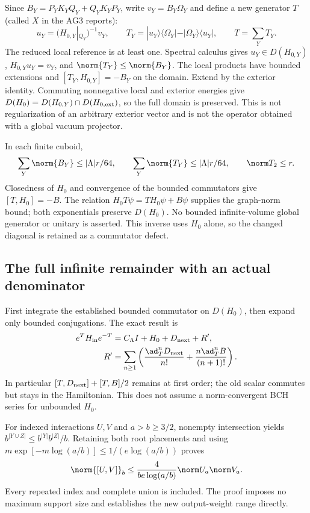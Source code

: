 Since $B_Y=P_YK_YQ_Y+Q_YK_YP_Y$, write $v_Y=B_Y\Omega_Y$ and define a new generator $T$ (called $X$ in the AG3 reports):
\begin{equation}
 u_Y=(H_{0,Y}|_{Q_Y})^{-1}v_Y,\qquad
 T_Y=|u_Y\rangle\langle\Omega_Y|-|\Omega_Y\rangle\langle u_Y|,
 \qquad T=\sum_Y T_Y.
 \label{r28:eq:ag3-generator}
\end{equation}
The reduced local reference is at least one. Spectral calculus gives $u_Y\in D(H_{0,Y})$, $H_{0,Y}u_Y=v_Y$, and $\norm{T_Y}\le\norm{B_Y}$. The local products have bounded extensions and $[T_Y,H_{0,Y}]=-B_Y$ on the domain. Extend by the exterior identity. Commuting nonnegative local and exterior energies give $D(H_0)=D(H_{0,Y})\cap D(H_{0,\rm ext})$, so the full domain is preserved. This is not regularization of an arbitrary exterior vector and is not the operator obtained with a global vacuum projector.

In each finite cuboid,
\begin{equation}
 \sum_Y\norm{B_Y}\le |\Lambda|r/64,\qquad
 \sum_Y\norm{T_Y}\le |\Lambda|r/64,\qquad \norm T_2\le r.
\end{equation}
Closedness of $H_0$ and convergence of the bounded commutators give $[T,H_0]=-B$. The relation $H_0T\psi=TH_0\psi+B\psi$ supplies the graph-norm bound; both exponentials preserve $D(H_0)$. No bounded infinite-volume global generator or unitary is asserted. This inverse uses $H_0$ alone, so the changed diagonal is retained as a commutator defect.

\subsection{The full infinite remainder with an actual denominator}
First integrate the established bounded commutator on $D(H_0)$, then expand only bounded conjugations. The exact result is
\begin{align}
 e^T H_{\rm in}e^{-T}&=C_\Lambda I+H_0+D_{\rm next}+R',\notag\\
 R'&=\sum_{n\ge1}\left(
 \frac{\ad_T^n D_{\rm next}}{n!}
 +\frac{n\ad_T^n B}{(n+1)!}\right).
 \label{r28:eq:ag3-full-tail}
\end{align}
In particular $[T,D_{\rm next}]+[T,B]/2$ remains at first order; the old scalar commutes but stays in the Hamiltonian. This does not assume a norm-convergent BCH series for unbounded $H_0$.

For indexed interactions $U,V$ and $a>b\ge3/2$, nonempty intersection yields $b^{|Y\cup Z|}\le b^{|Y|}b^{|Z|}/b$. Retaining both root placements and using $m\exp[-m\log(a/b)]\le1/(e\log(a/b))$ proves
\begin{equation}
 \norm{[U,V]}_b\le\frac{4}{be\log(a/b)}\norm U_a\norm V_a.
 \label{r28:eq:ag3-commutator}
\end{equation}
Every repeated index and complete union is included. The proof imposes no maximum support size and establishes the new output-weight range directly.

